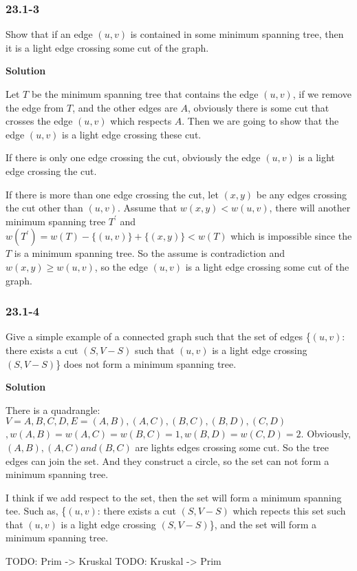 \subsubsection {23.1-3}

Show that if an edge $(u, v)$ is contained in some minimum spanning tree, then
it is a light edge crossing some cut of the graph.

\textbf{Solution}

Let $T$ be the minimum spanning tree that contains the edge $(u, v)$, if we
remove the edge from $T$, and the other edges are $A$, obviously there is some
cut that crosses the edge $(u, v)$ which respects $A$. Then we are going to show
that the edge $(u, v)$ is a light edge crossing these cut.

If there is only one edge crossing the cut, obviously the edge $(u, v)$ is a
light edge crossing the cut.

If there is more than one edge crossing the cut, let $(x, y)$ be any edges
crossing the cut other than $(u, v)$. Assume that $w(x, y) < w(u, v)$, there
will another minimum spanning tree $T^{'}$ and
$w(T^{'}) = w(T) - \{(u, v)\} + \{(x, y)\} < w(T)$ which is impossible since the
$T$ is a minimum spanning tree. So the assume is contradiction and
$w(x, y) \geq w(u, v)$, so the edge $(u, v)$ is a light edge crossing some cut
of the graph.

\subsubsection {23.1-4}

Give a simple example of a connected graph such that the set of edges
\{$(u, v)$: there exists a cut $(S, V - S)$ such that $(u, v)$ is a light edge
crossing $(S, V - S)$\} does not form a minimum spanning tree.

\textbf{Solution}

There is a quadrangle: $V={A,B,C,D}, E={(A,B), (A,C), (B,C), (B,D), (C,D)}$
$, w(A,B)=w(A,C)=w(B,C)=1, w(B,D)=w(C,D)=2$. Obviously, $(A,B), (A,C) and (B,C)$
are lights edges crossing some cut. So the tree edges can join the set. And they
construct a circle, so the set can not form a minimum spanning tree.

I think if we add {\color{red} respect} to the set, then the set will form a
minimum spanning tee. Such as, \{$(u, v)$: there exists a cut $(S, V - S)$
{\color{red} which repects this set} such that $(u, v)$ is a light edge
crossing $(S, V - S)$\}, and the set will form a minimum spanning tree.






TODO: Prim -> Kruskal
TODO: Kruskal -> Prim
